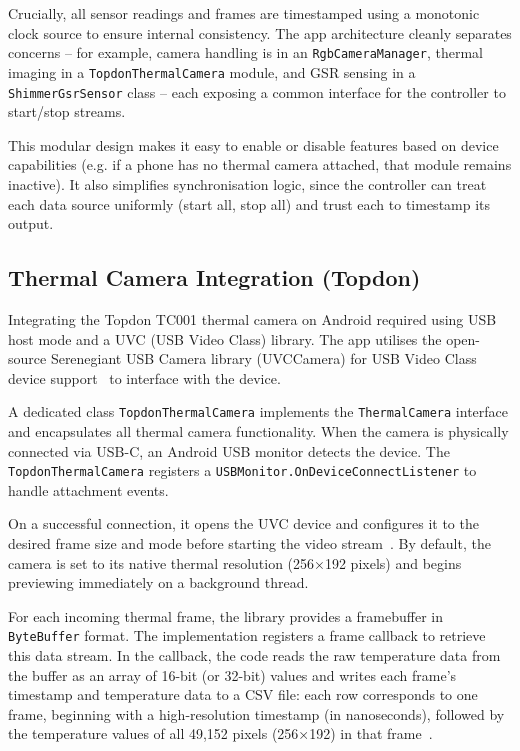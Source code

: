 Crucially, all sensor readings and frames are timestamped using a monotonic clock source to ensure internal consistency. The app architecture cleanly separates concerns -- for example, camera handling is in an \texttt{RgbCameraManager}, thermal imaging in a \texttt{TopdonThermalCamera} module, and GSR sensing in a \texttt{ShimmerGsrSensor} class -- each exposing a common interface for the controller to start/stop streams.

This modular design makes it easy to enable or disable features based on device capabilities (e.g. if a phone has no thermal camera attached, that module remains inactive). It also simplifies synchronisation logic, since the controller can treat each data source uniformly (start all, stop all) and trust each to timestamp its output.

\subsection{Thermal Camera Integration (Topdon)}

Integrating the Topdon TC001 thermal camera on Android required using USB host mode and a UVC (USB Video Class) library. The app utilises the open-source Serenegiant USB Camera library (UVCCamera) for USB Video Class device support~\cite{serenegiant2025uvc} to interface with the device.

A dedicated class \texttt{TopdonThermalCamera} implements the \texttt{ThermalCamera} interface and encapsulates all thermal camera functionality. When the camera is physically connected via USB-C, an Android USB monitor detects the device. The \texttt{TopdonThermalCamera} registers a \texttt{USBMonitor.OnDeviceConnectListener} to handle attachment events.

On a successful connection, it opens the UVC device and configures it to the desired frame size and mode before starting the video stream~\cite{serenegiant2025uvc}. By default, the camera is set to its native thermal resolution (256×192 pixels) and begins previewing immediately on a background thread.

For each incoming thermal frame, the library provides a framebuffer in \texttt{ByteBuffer} format. The implementation registers a frame callback to retrieve this data stream. In the callback, the code reads the raw temperature data from the buffer as an array of 16-bit (or 32-bit) values and writes each frame's timestamp and temperature data to a CSV file: each row corresponds to one frame, beginning with a high-resolution timestamp (in nanoseconds), followed by the temperature values of all 49,152 pixels (256×192) in that frame~\cite{serenegiant2025uvc}.

